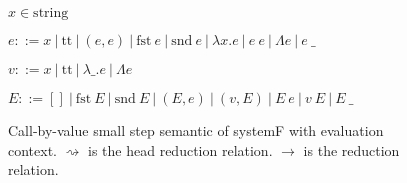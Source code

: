 \newcommand{\hstep}{\rightsquigarrow}
\newcommand{\step}{\rightarrow}
\begin{figure}[ht]

  $x \in \mathrm{string}$

  $e ::= x\ |\ \mathrm{tt}\
  |\ (e,e)\
  |\ \mathrm{fst}\ e\
  |\ \mathrm{snd}\ e\
  |\ \lambda x. e\
  |\ e\ e\
  |\ \Lambda e\
  |\ e\ \_
  $

  $v ::= x\ |\ \mathrm{tt}\ |\ \lambda \_. e\ |\ \Lambda e$

  $E ::= []\
  |\ \ E\
  |\ \mathrm{snd}\ E\
  |\ (E, e)\
  |\ (v, E)\
  |\ E\ e\
  |\ v\ E\
  |\ E\ \_
  $

  \centering
  \caption{\label{fig:opsemSF1} Call-by-value small step semantic of systemF with
    evaluation context. $\hstep$ is the head reduction relation. $\step$ is
    the reduction relation.}
\end{figure}
